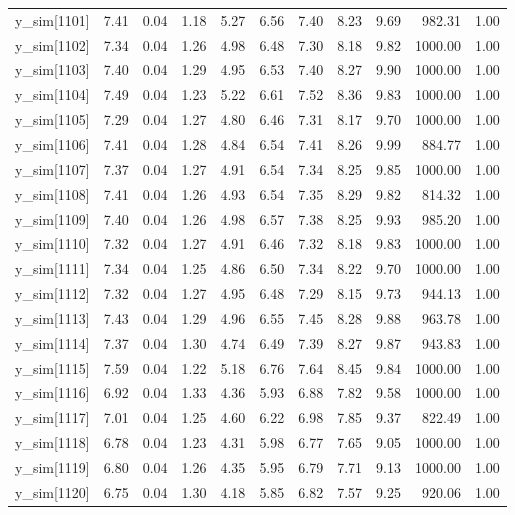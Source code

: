 \begin{table}[ht]
\begin{tabular}{rrrrrrrrrrr}
  y\_sim[1101] & 7.41 & 0.04 & 1.18 & 5.27 & 6.56 & 7.40 & 8.23 & 9.69 & 982.31 & 1.00 \\ 
  y\_sim[1102] & 7.34 & 0.04 & 1.26 & 4.98 & 6.48 & 7.30 & 8.18 & 9.82 & 1000.00 & 1.00 \\ 
  y\_sim[1103] & 7.40 & 0.04 & 1.29 & 4.95 & 6.53 & 7.40 & 8.27 & 9.90 & 1000.00 & 1.00 \\ 
  y\_sim[1104] & 7.49 & 0.04 & 1.23 & 5.22 & 6.61 & 7.52 & 8.36 & 9.83 & 1000.00 & 1.00 \\ 
  y\_sim[1105] & 7.29 & 0.04 & 1.27 & 4.80 & 6.46 & 7.31 & 8.17 & 9.70 & 1000.00 & 1.00 \\ 
  y\_sim[1106] & 7.41 & 0.04 & 1.28 & 4.84 & 6.54 & 7.41 & 8.26 & 9.99 & 884.77 & 1.00 \\ 
  y\_sim[1107] & 7.37 & 0.04 & 1.27 & 4.91 & 6.54 & 7.34 & 8.25 & 9.85 & 1000.00 & 1.00 \\ 
  y\_sim[1108] & 7.41 & 0.04 & 1.26 & 4.93 & 6.54 & 7.35 & 8.29 & 9.82 & 814.32 & 1.00 \\ 
  y\_sim[1109] & 7.40 & 0.04 & 1.26 & 4.98 & 6.57 & 7.38 & 8.25 & 9.93 & 985.20 & 1.00 \\ 
  y\_sim[1110] & 7.32 & 0.04 & 1.27 & 4.91 & 6.46 & 7.32 & 8.18 & 9.83 & 1000.00 & 1.00 \\ 
  y\_sim[1111] & 7.34 & 0.04 & 1.25 & 4.86 & 6.50 & 7.34 & 8.22 & 9.70 & 1000.00 & 1.00 \\ 
  y\_sim[1112] & 7.32 & 0.04 & 1.27 & 4.95 & 6.48 & 7.29 & 8.15 & 9.73 & 944.13 & 1.00 \\ 
  y\_sim[1113] & 7.43 & 0.04 & 1.29 & 4.96 & 6.55 & 7.45 & 8.28 & 9.88 & 963.78 & 1.00 \\ 
  y\_sim[1114] & 7.37 & 0.04 & 1.30 & 4.74 & 6.49 & 7.39 & 8.27 & 9.87 & 943.83 & 1.00 \\ 
  y\_sim[1115] & 7.59 & 0.04 & 1.22 & 5.18 & 6.76 & 7.64 & 8.45 & 9.84 & 1000.00 & 1.00 \\ 
  y\_sim[1116] & 6.92 & 0.04 & 1.33 & 4.36 & 5.93 & 6.88 & 7.82 & 9.58 & 1000.00 & 1.00 \\ 
  y\_sim[1117] & 7.01 & 0.04 & 1.25 & 4.60 & 6.22 & 6.98 & 7.85 & 9.37 & 822.49 & 1.00 \\ 
  y\_sim[1118] & 6.78 & 0.04 & 1.23 & 4.31 & 5.98 & 6.77 & 7.65 & 9.05 & 1000.00 & 1.00 \\ 
  y\_sim[1119] & 6.80 & 0.04 & 1.26 & 4.35 & 5.95 & 6.79 & 7.71 & 9.13 & 1000.00 & 1.00 \\ 
  y\_sim[1120] & 6.75 & 0.04 & 1.30 & 4.18 & 5.85 & 6.82 & 7.57 & 9.25 & 920.06 & 1.00 \\ 

\end{tabular}
\end{table}
